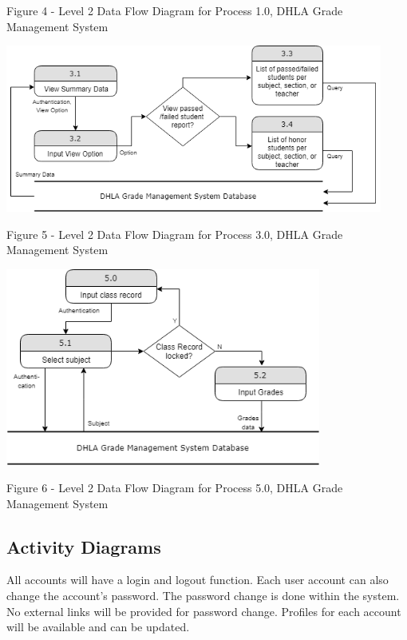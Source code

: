 \documentclass[11pt,a4paper,titlepage]{article}
\begin{document}
\begin{center}
    Figure 4 - Level 2 Data Flow Diagram for Process 1.0, DHLA Grade Management System
\end{center}
\vspace{2cm}
\begin{center}
\includegraphics[height=5.5cm]{Subexplotion-3.png}
\end{center}
\begin{center}
    Figure 5 - Level 2 Data Flow Diagram for Process 3.0, DHLA Grade Management System
\end{center}
\vspace{2cm}
\begin{center}
\includegraphics[height=6.5cm]{Subexplotion-5.png}
\end{center}
\begin{center}
    Figure 6 - Level 2 Data Flow Diagram for Process 5.0, DHLA Grade Management System
\end{center}

\subsection{Activity Diagrams}

All accounts will have a login and logout function. Each user account can also change the account's password. The password change is done within the system. No external links will be provided for password change. Profiles for each account will be available and can be updated.
\end{document}
